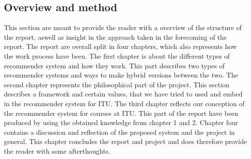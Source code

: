\subsection*{Overview and method}
This section are meant to provide the reader with a overview of the structure of the report, aswell as insight in the approach taken in the forecoming of the report.\newline
The report are overall split in four chapters, which also represents how the work process have been. The first chapter is about the different types of recommender system and how they work. This part describes two types of recommender systems and ways to make hybrid versions between the two.\newline
The second chapter represents the philosophical part of the project. This section describes a framework and certain values, that we have tried to used and embed in the recommender system for ITU. \newline
The third chapter reflects our conception of the recommender system for courses at ITU. This part of the report have been produced by using the obtained knowledge from chapter 1 and 2.
Chapter four contains a discussion and reflection of the proposed system and the project in general. This chapter concludes the report and project and does therefore provide the reader with some afterthoughts.\newline
\newpage